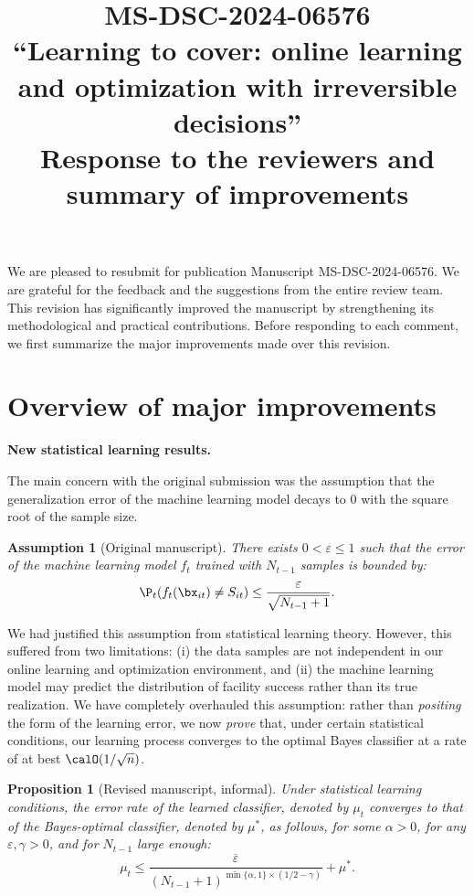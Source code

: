 \documentclass[11pt]{article}
\title{\bf\Large MS-DSC-2024-06576\\``Learning to cover: online learning and optimization with irreversible decisions''\\ Response to the reviewers and summary of improvements}
\author{}
\date{}
\newtheorem{proposition}{Proposition}[]
\newtheorem{assumption}{Assumption}[]
\begin{document}
\maketitle

We are pleased to resubmit for publication Manuscript MS-DSC-2024-06576. We are grateful for the feedback and the suggestions from the entire review team. This revision has significantly improved the manuscript by strengthening its methodological and practical contributions. Before responding to each comment, we first summarize the major improvements made over this revision.

\tableofcontents

\newpage

\section*{Overview of major improvements}
%
\label{sec:overview}

\textbf{New statistical learning results.}

The main concern with the original submission was the assumption that the generalization error of the machine learning model decays to 0 with the square root of the sample size.
\begin{assumption}[Original manuscript] \label{ass:classification_old_summary}
    There exists $0<\varepsilon\leq 1$ such that the error of the machine learning model $f_t$ trained with $N_{t-1}$ samples is bounded by:
    \begin{align*}
         \P_{t}(f_t(\bx_{it})\neq S_{it})\leq \frac{\varepsilon }{\sqrt{N_{t-1} + 1}}.
    \end{align*}
\end{assumption}

We had justified this assumption from statistical learning theory. However, this suffered from two limitations: (i) the data samples are not independent in our online learning and optimization environment, and (ii) the machine learning model may predict the distribution of facility success rather than its true realization. We have completely overhauled this assumption: rather than \textit{positing} the form of the learning error, we now \textit{prove} that, under certain statistical conditions, our learning process converges to the optimal Bayes classifier at a rate of at best $\calO(1/\sqrt{n})$.
\begin{proposition}[Revised manuscript, informal]\label{prop:MLE_informal_summary}
       Under statistical learning conditions, the error rate of the learned classifier, denoted by $\mu_t$ converges to that of the Bayes-optimal classifier, denoted by $\mu^*$, as follows, for some $\alpha>0$, for any $\varepsilon,\gamma>0$, and for $N_{t-1}$ large enough:
        \[\mu_t \leq \frac{\overline\varepsilon}{(N_{t-1}+1)^{\min\{\alpha,1\}\times (1/2-\gamma)}}+\mu^*.\]
\end{proposition}
\end{document}
